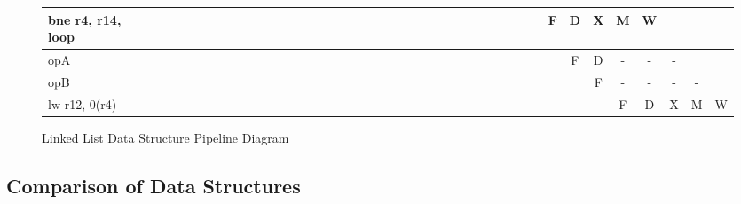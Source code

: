 \documentclass[10pt]{article}
\begin{document}
\begin{landscape}
\begin{figure}[H]
{\begin{tabular}{|l|c|c|c|c!{\vrule width 1.5pt}c|c|c|c|c|c|c|c|c|c|c|c|c|c|c|c|c|c!{\vrule width 1.5pt}c|c|c|c|c|c|c|c|c|c|c|c|c|c|c|c|c|c!{\vrule width 1.5pt}c|}
bne r4, r14, loop &   &   &   &   &   &   &   &   &   &    &    &    &    &    &    &    &    &    &    &    &    &    &    &    &    &    &    &    &    &    &    &    &    & F  & D  & X  & M  & W  &    &    &    \\ \hline
opA               &   &   &   &   &   &   &   &   &   &    &    &    &    &    &    &    &    &    &    &    &    &    &    &    &    &    &    &    &    &    &    &    &    &    & F  & D  & -  & -  & -  &    &    \\ \hline
opB               &   &   &   &   &   &   &   &   &   &    &    &    &    &    &    &    &    &    &    &    &    &    &    &    &    &    &    &    &    &    &    &    &    &    &    & F  & -  & -  & -  & -  &    \\ \hline
lw r12, 0(r4)     &   &   &   &   &   &   &   &   &   &    &    &    &    &    &    &    &    &    &    &    &    &    &    &    &    &    &    &    &    &    &    &    &    &    &    &    & F  & D  & X  & M  & W  \\ \hline
\end{tabular}
}
\caption{Linked List Data Structure Pipeline Diagram}
\end{figure}
\end{landscape}

\subsection{Comparison of Data Structures}
\end{document}
